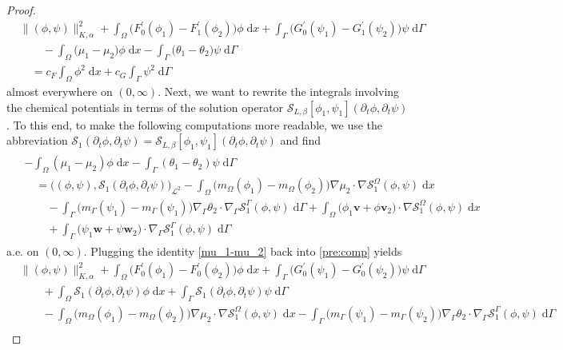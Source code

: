 \documentclass[10pt,reqno]{amsart}
\theoremstyle{remark}
\numberwithin{equation}{section}
\newcommand{\norm}[1]{\| #1 \|}
\newcommand{\intO}{\int_\Omega}
\newcommand{\intG}{\int_\Gamma}
\newcommand{\dx}{\;\mathrm{d}x}
\newcommand{\dG}{\;\mathrm d\Ga}
\newcommand{\delt}{\partial_{t}}
\newcommand{\Grad}{\nabla}
\newcommand{\Gradg}{\nabla_\Ga}
\newcommand{\Om}{\Omega}
\newcommand{\Ga}{\Gamma}
\begin{document}
\begin{proof}
    \begin{align}\label{pre:comp}
        &\norm{(\phi,\psi)}_{K,\alpha}^2 + \intO \big(F_0^\prime(\phi_1) - F_1^\prime(\phi_2)\big)\phi\dx + \intG \big(G_0^\prime(\psi_1) - G_1^\prime(\psi_2)\big)\psi\dG \nonumber \\
        &\qquad - \intO \big(\mu_1 - \mu_2)\phi\dx - \intG \big(\theta_1 - \theta_2\big)\psi\dG \\
        &\quad = c_F\intO \phi^2\dx + c_G\intG \psi^2\dG \nonumber
    \end{align}
    almost everywhere on $(0,\infty)$. Next, we want to rewrite the integrals involving the chemical potentials in terms of the solution operator $\mathcal{S}_{L,\beta}[\phi_1,\psi_1](\delt\phi,\delt\psi)$. To this end, to make the following computations more readable, we use the abbreviation $\mathcal{S}_1(\delt\phi,\delt\psi) = \mathcal{S}_{L,\beta}[\phi_1,\psi_1](\delt\phi,\delt\psi)$ and find
    \begin{align}\label{mu_1-mu_2}
        \begin{split}
            &-\intO (\mu_1 - \mu_2)\phi\dx - \intG (\theta_1 - \theta_2)\psi\dG \\
            &\quad = \big((\phi,\psi),\mathcal{S}_1(\delt\phi,\delt\psi)\big)_{\mathcal{L}^2} - \intO \big(m_\Om(\phi_1) - m_\Om(\phi_2)\big)\Grad\mu_2\cdot\Grad\mathcal{S}_1^\Om(\phi,\psi)\dx \\
            &\qquad - \intG (m_\Ga(\psi_1) - m_\Ga(\psi_1)\big)\Gradg\theta_2\cdot\Gradg\mathcal{S}_1^\Ga(\phi,\psi)\dG + \intO \big(\phi_1\mathbf{v} + \phi\mathbf{v}_2\big)\cdot\Grad\mathcal{S}_1^\Om(\phi,\psi)\dx \\
            &\qquad + \intG \big(\psi_1\mathbf{w} + \psi\mathbf{w}_2\big)\cdot\Gradg\mathcal{S}_1^\Ga(\phi,\psi)\dG
        \end{split}
    \end{align}
    a.e. on $(0,\infty)$.
    Plugging the identity \eqref{mu_1-mu_2} back into \eqref{pre:comp} yields
    \begin{align*}
    	&\norm{(\phi,\psi)}_{K,\alpha}^2 + \intO \big(F_0^\prime(\phi_1) - F_0^\prime(\phi_2)\big)\phi\dx + \intG \big(G_0^\prime(\psi_1) - G_0^\prime(\psi_2)\big)\psi\dG \\
    	&\qquad  + \intO \mathcal{S}_1(\delt\phi,\delt\psi)\phi\dx + \intG \mathcal{S}_1(\delt\phi,\delt\psi)\psi\dG \\
        &\qquad - \intO \big(m_\Om(\phi_1) - m_\Om(\phi_2)\big)\Grad\mu_2\cdot\Grad\mathcal{S}^\Om_1(\phi,\psi)\dx - \intG \big(m_\Ga(\psi_1) - m_\Ga(\psi_2)\big)\Gradg\theta_2\cdot\Gradg\mathcal{S}^\Ga_1(\phi,\psi)\dG \\

\end{align*}
\end{proof}
\end{document}
